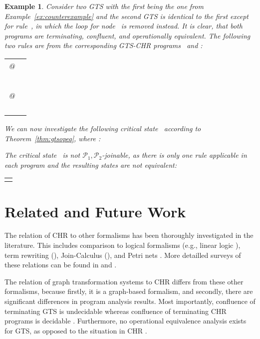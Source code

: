\documentclass{tlp}
\newtheorem{example}{Example}[section]
\newcommand{\mcP}{\ensuremath{\mathcal{P}}}
\newcommand{\Ps}{\ensuremath{\mcP_1,\mcP_2}}
\begin{document}
\begin{example}

Consider two GTS with the first being the one from
Example~\ref{ex:counterexample} and the second GTS is identical to the first
except for rule~, in which the loop for node~ is removed instead. It is
clear, that both programs are terminating, confluent, and operationally
equivalent. The following two rules are from the corresponding GTS-CHR
programs~ and :\\
\begin{tabular}{ll}
 @ & \\
&  \\
&  \\
& \\
& \\
\\
 @ & \\
&  \\
&  \\
& \\
& 
\end{tabular}

We can now investigate the following critical state~ according to
Theorem~\ref{thm:gtsopeq}, where :


The critical state~ is not \Ps-joinable, as there is only one rule
applicable in each program and the resulting states are not equivalent:\\
\begin{tabular}{r} 
\\
\\

\end{tabular}
\end{example}   

\section{Related and Future Work}
\label{sec:related_work}

The relation of CHR to other formalisms has been thoroughly investigated in the
literature. This includes comparison to logical formalisms (e.g., linear logic
\cite{Betz2005}), term rewriting
(\cite{duck_stuck_brand_acd_term_rewriting_iclp06}), Join-Calculus
(\cite{lam_sulz_finallyjoin_chr08}), and Petri nets \cite{betz_petri_nets_chr07}.
More detailled surveys of these relations can be found in
\cite{chr_survey_tplp08} and \cite{fruehwirth09}.

The relation of graph transformation systems to CHR differs from these other
formalisms, because firstly, it is a graph-based formalism, and secondly, there
are significant differences in program analysis results. Most importantly,
confluence of terminating GTS is undecidable \cite{plump05} whereas confluence of
terminating CHR programs is decidable \cite{abdennadherfruehwirthmeuss99}.
Furthermore, no operational equivalence analysis exists for GTS, as opposed to
the situation in CHR \cite{abdennadherfruehwirth99}.
\end{document}
